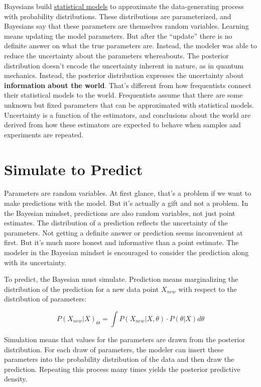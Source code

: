 \documentclass[
  10pt,
]{scrbook}
\begin{document}
Bayesians build \protect\hyperlink{statistical-modeling}{statistical models} to approximate the data-generating process with probability distributions.
These distributions are parameterized, and Bayesians say that these parameters are themselves random variables.
Learning means updating the model parameters.
But after the ``update'' there is no definite answer on what the true parameters are.
Instead, the modeler was able to reduce the uncertainty about the parameters whereabouts.
The posterior distribution doesn't encode the uncertainty inherent in nature, as in quantum mechanics.
Instead, the posterior distribution expresses the uncertainty about \textbf{information about the world}.
That's different from how frequentists connect their statistical models to the world.
Frequentists assume that there are some unknown but fixed parameters that can be approximated with statistical models.
Uncertainty is a function of the estimators, and conclusions about the world are derived from how these estimators are expected to behave when samples and experiments are repeated.

\hypertarget{simulate-to-predict}{%
\section{Simulate to Predict}\label{simulate-to-predict}}

Parameters are random variables.
At first glance, that's a problem if we want to make predictions with the model.
But it's actually a gift and not a problem.
In the Bayesian mindset, predictions are also random variables, not just point estimates.
The distribution of a prediction reflects the uncertainty of the parameters.
Not getting a definite answer or prediction seems inconvenient at first.
But it's much more honest and informative than a point estimate.
The modeler in the Bayesian mindset is encouraged to consider the prediction along with its uncertainty.

To predict, the Bayesian must simulate.
Prediction means marginalizing the distribution of the prediction for a new data point \(X_{new}\) with respect to the distribution of parameters:

\[P(X_{new} | X)_{\Theta} = \int P(X_{new} | X, \theta) \cdot P(\theta | X) d\theta\]

Simulation means that values for the parameters are drawn from the posterior distribution.
For each draw of parameters, the modeler can insert these parameters into the probability distribution of the data and then draw the prediction.
Repeating this process many times yields the posterior predictive density.
\end{document}
